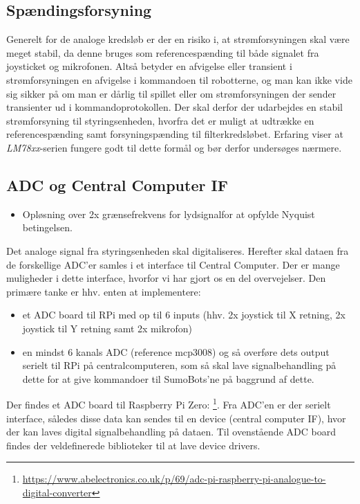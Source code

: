 \subsection{Spændingsforsyning}
Generelt for de analoge kredsløb er der en risiko i, at strømforsyningen skal være meget stabil, da denne bruges som referencespænding til både signalet fra joysticket og mikrofonen. Altså betyder en afvigelse eller transient i strømforsyningen en afvigelse i kommandoen til robotterne, og man kan ikke vide sig sikker på om man er dårlig til spillet eller om strømforsyningen der sender transienter ud i kommandoprotokollen. Der skal derfor der udarbejdes en stabil strømforsyning til styringsenheden, hvorfra det er muligt at udtrække en referencespænding samt forsyningspænding til filterkredsløbet. Erfaring viser at \emph{LM78xx}-serien fungere godt til dette formål og bør derfor undersøges nærmere\tbr. 


\subsection{ADC og Central Computer IF}
\begin{itemize}
    \item \tbr Opløsning over 2x grænsefrekvens for lydsignal\tbr for at opfylde Nyquist betingelsen. 
\end{itemize}
\tbr Det analoge signal fra styringsenheden skal digitaliseres. Herefter skal dataen fra de forskellige ADC'er samles i et interface til Central Computer. Der er mange muligheder i dette interface, hvorfor vi har gjort os en del overvejelser. Den primære tanke er hhv. enten at implementere:

\begin{itemize}
    \item et ADC board til RPi med op til 6 inputs (hhv. 2x joystick til X retning, 2x joystick til Y retning samt 2x mikrofon)
    \item en mindst 6 kanals ADC (\tbr reference mcp3008) og så overføre dets output serielt til RPi på centralcomputeren, som så skal lave signalbehandling på dette for at give kommandoer til SumoBots'ne på baggrund af dette. 
\end{itemize}

Der findes et ADC board til Raspberry Pi Zero: \footnote{\url{https://www.abelectronics.co.uk/p/69/adc-pi-raspberry-pi-analogue-to-digital-converter}}. Fra ADC'en er der serielt interface, således disse data kan sendes til en device (central computer IF), hvor der kan laves digital signalbehandling på dataen. Til ovenstående ADC board findes der veldefinerede biblioteker til at lave device drivers. 

